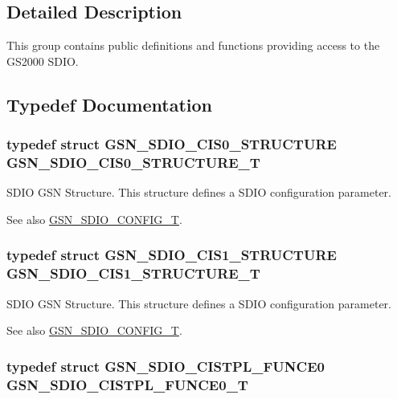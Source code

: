 \subsection{Detailed Description}
This group contains public definitions and functions providing access to the GS2000 SDIO. 

\subsection{Typedef Documentation}
\hypertarget{a00653_ga2f12cafa4d1da2cd11c4260521e66faa}{
\subsubsection[{GSN\_\-SDIO\_\-CIS0\_\-STRUCTURE\_\-T}]{\setlength{\rightskip}{0pt plus 5cm}typedef struct {\bf GSN\_\-SDIO\_\-CIS0\_\-STRUCTURE} {\bf GSN\_\-SDIO\_\-CIS0\_\-STRUCTURE\_\-T}}}
\label{a00653_ga2f12cafa4d1da2cd11c4260521e66faa}


SDIO GSN Structure. This structure defines a SDIO configuration parameter. 

\begin{DoxySeeAlso}{See also}
\hyperlink{a00653_ga741fda4dc2cd93143a8a73ddaace7de8}{GSN\_\-SDIO\_\-CONFIG\_\-T}. 
\end{DoxySeeAlso}
\hypertarget{a00653_ga5f22dc1b4e23d8bf5f7d492e5c786a47}{
\subsubsection[{GSN\_\-SDIO\_\-CIS1\_\-STRUCTURE\_\-T}]{\setlength{\rightskip}{0pt plus 5cm}typedef struct {\bf GSN\_\-SDIO\_\-CIS1\_\-STRUCTURE} {\bf GSN\_\-SDIO\_\-CIS1\_\-STRUCTURE\_\-T}}}
\label{a00653_ga5f22dc1b4e23d8bf5f7d492e5c786a47}


SDIO GSN Structure. This structure defines a SDIO configuration parameter. 

\begin{DoxySeeAlso}{See also}
\hyperlink{a00653_ga741fda4dc2cd93143a8a73ddaace7de8}{GSN\_\-SDIO\_\-CONFIG\_\-T}. 
\end{DoxySeeAlso}
\hypertarget{a00653_ga9437621f0901955674de851edfc146b0}{
\subsubsection[{GSN\_\-SDIO\_\-CISTPL\_\-FUNCE0\_\-T}]{\setlength{\rightskip}{0pt plus 5cm}typedef struct {\bf GSN\_\-SDIO\_\-CISTPL\_\-FUNCE0} {\bf GSN\_\-SDIO\_\-CISTPL\_\-FUNCE0\_\-T}}}
\label{a00653_ga9437621f0901955674de851edfc146b0}



